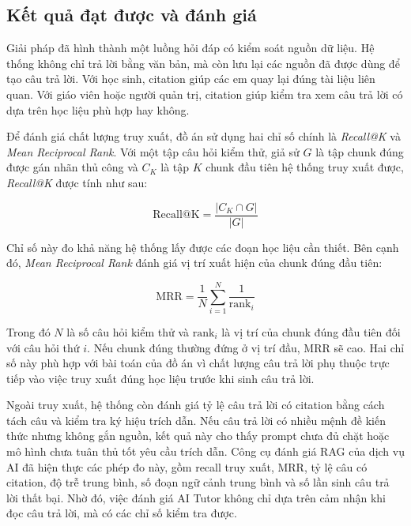 \documentclass[../DoAn.tex]{subfiles}
\begin{document}
\subsection{Kết quả đạt được và đánh giá}
\label{section:5.1.3}

Giải pháp đã hình thành một luồng hỏi đáp có kiểm soát nguồn dữ liệu. Hệ thống không chỉ trả lời bằng văn bản, mà còn lưu lại các nguồn đã được dùng để tạo câu trả lời. Với học sinh, citation giúp các em quay lại đúng tài liệu liên quan. Với giáo viên hoặc người quản trị, citation giúp kiểm tra xem câu trả lời có dựa trên học liệu phù hợp hay không.

Để đánh giá chất lượng truy xuất, đồ án sử dụng hai chỉ số chính là \textit{Recall@K} và \textit{Mean Reciprocal Rank}. Với một tập câu hỏi kiểm thử, giả sử \(G\) là tập chunk đúng được gán nhãn thủ công và \(C_K\) là tập \(K\) chunk đầu tiên hệ thống truy xuất được, \textit{Recall@K} được tính như sau:

\begin{equation}
\mathrm{Recall@K} = \frac{|C_K \cap G|}{|G|}
\end{equation}

Chỉ số này đo khả năng hệ thống lấy được các đoạn học liệu cần thiết. Bên cạnh đó, \textit{Mean Reciprocal Rank} đánh giá vị trí xuất hiện của chunk đúng đầu tiên:

\begin{equation}
\mathrm{MRR} = \frac{1}{N}\sum_{i=1}^{N}\frac{1}{\mathrm{rank}_i}
\end{equation}

Trong đó \(N\) là số câu hỏi kiểm thử và \(\mathrm{rank}_i\) là vị trí của chunk đúng đầu tiên đối với câu hỏi thứ \(i\). Nếu chunk đúng thường đứng ở vị trí đầu, MRR sẽ cao. Hai chỉ số này phù hợp với bài toán của đồ án vì chất lượng câu trả lời phụ thuộc trực tiếp vào việc truy xuất đúng học liệu trước khi sinh câu trả lời.

Ngoài truy xuất, hệ thống còn đánh giá tỷ lệ câu trả lời có citation bằng cách tách câu và kiểm tra ký hiệu trích dẫn. Nếu câu trả lời có nhiều mệnh đề kiến thức nhưng không gắn nguồn, kết quả này cho thấy prompt chưa đủ chặt hoặc mô hình chưa tuân thủ tốt yêu cầu trích dẫn. Công cụ đánh giá RAG của dịch vụ AI đã hiện thực các phép đo này, gồm recall truy xuất, MRR, tỷ lệ câu có citation, độ trễ trung bình, số đoạn ngữ cảnh trung bình và số lần sinh câu trả lời thất bại. Nhờ đó, việc đánh giá AI Tutor không chỉ dựa trên cảm nhận khi đọc câu trả lời, mà có các chỉ số kiểm tra được.
\end{document}
